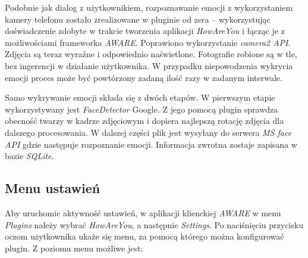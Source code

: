 Podobnie jak dialog z użytkownikiem, rozpoznawanie emocji z wykorzystaniem kamery telefonu zostało zrealizowane w pluginie od zera -- wykorzystując doświadczenie zdobyte w trakcie tworzenia aplikacji \textit{HowAreYou} i łącząc je z możliwościami frameworka \textit{AWARE}. Poprawiono wykorzystanie \textit{camera2 API}. Zdjęcia są teraz wyraźne i odpowiednio naświetlone. Fotografie robione są w tle, bez ingerencji w działanie użytkownika. W przypadku niepowodzenia wykrycia emocji proces może być powtórzony zadaną ilość razy w zadanym interwale.

Samo wykrywanie emocji składa się z dwóch etapów. W pierwszym etapie wykorzystywany jest \textit{FaceDetector} Google. Z jego pomocą plugin sprawdza obecność twarzy w kadrze zdjęciowym i dopiera najlepszą rotację zdjęcia dla dalszego procesowania. W dalszej części plik jest wysyłany do serwera \textit{MS face API} gdzie następuje rozpoznanie emocji. Informacja zwrotna zostaje zapisana w bazie \textit{SQLite}.


\subsection{Menu ustawień}


Aby uruchomic aktywność ustawień, w aplikacji klienckiej \textit{AWARE} w menu \textit{Plugins} należy wybrać \textit{HowAreYou}, a następnie \textit{Settings}. Po naciśnięciu przycisku oczom użytkownika ukaże się menu, za pomocą którego można konfigurować plugin. Z poziomu menu możliwe jest:

